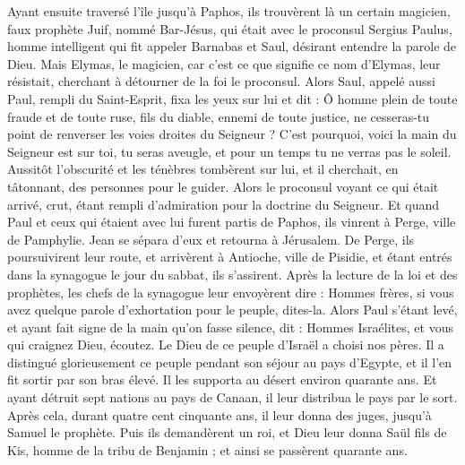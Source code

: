 \begin{multicols}{2}
{
Ayant ensuite traversé l'île jusqu'à Paphos, ils trouvèrent là un certain magicien, faux prophète Juif, nommé Bar-Jésus,
qui était avec le proconsul Sergius Paulus, homme intelligent qui fit appeler Barnabas et Saul, désirant entendre la parole de Dieu.
Mais Elymas, le magicien, car c'est ce que signifie ce nom d'Elymas, leur résistait, cherchant à détourner de la foi le proconsul.
Alors Saul, appelé aussi Paul, rempli du Saint-Esprit, fixa les yeux sur lui et dit :
Ô homme plein de toute fraude et de toute ruse, fils du diable, ennemi de toute justice, ne cesseras-tu point de renverser les voies droites du Seigneur ?
C'est pourquoi, voici la main du Seigneur est sur toi, tu seras aveugle, et pour un temps tu ne verras pas le soleil. Aussitôt l'obscurité et les ténèbres tombèrent sur lui, et il cherchait, en tâtonnant, des personnes pour le guider.
Alors le proconsul voyant ce qui était arrivé, crut, étant rempli d'admiration pour la doctrine du Seigneur.
Et quand Paul et ceux qui étaient avec lui furent partis de Paphos, ils vinrent à Perge, ville de Pamphylie. Jean se sépara d'eux et retourna à Jérusalem.
De Perge, ils poursuivirent leur route, et arrivèrent à Antioche, ville de Pisidie, et étant entrés dans la synagogue le jour du sabbat, ils s'assirent.
Après la lecture de la loi et des prophètes, les chefs de la synagogue leur envoyèrent dire : Hommes frères, si vous avez quelque parole d'exhortation pour le peuple, dites-la.
Alors Paul s'étant levé, et ayant fait signe de la main qu'on fasse silence, dit : Hommes Israélites, et vous qui craignez Dieu, écoutez.
Le Dieu de ce peuple d'Israël a choisi nos pères. Il a distingué glorieusement ce peuple pendant son séjour au pays d'Egypte, et il l'en fit sortir par son bras élevé.
Il les supporta au désert environ quarante ans.
Et ayant détruit sept nations au pays de Canaan, il leur distribua le pays par le sort.
Après cela, durant quatre cent cinquante ans, il leur donna des juges, jusqu'à Samuel le prophète.
Puis ils demandèrent un roi, et Dieu leur donna Saül fils de Kis, homme de la tribu de Benjamin ; et ainsi se passèrent quarante ans.
}
\end{multicols}
